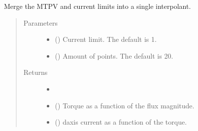 \documentclass[letterpaper,10pt,english]{sphinxmanual}
\begin{document}
\begin{fulllineitems}
\begin{fulllineitems}
\end{fulllineitems}


\begin{fulllineitems}
\label{\detokenize{control.sm:control.sm.torque.TorqueCharacteristics.mtpv_and_current_limits}}
\pysigstartsignatures
{}
\pysigstopsignatures
\sphinxAtStartPar
Merge the MTPV and current limits into a single interpolant.
\begin{quote}\begin{description}
\item[{Parameters}] \leavevmode\begin{itemize}
\item {} 
\sphinxAtStartPar
{} (\sphinxstyleliteralemphasis{\sphinxupquote{, }}) \textendash{} Current limit. The default is 1.

\item {} 
\sphinxAtStartPar
{} (\sphinxstyleliteralemphasis{\sphinxupquote{, }}) \textendash{} Amount of points. The default is 20.

\end{itemize}

\item[{Returns}] \leavevmode
\sphinxAtStartPar
\begin{itemize}
\item {} 
\sphinxAtStartPar
{}

\item {} 
\sphinxAtStartPar
{} () \textendash{} Torque as a function of the flux magnitude.

\item {} 
\sphinxAtStartPar
{} () \textendash{} d\sphinxhyphen{}axis current as a function of the torque.


\end{itemize}
\end{description}
\end{quote}
\end{fulllineitems}
\end{fulllineitems}
\end{document}
